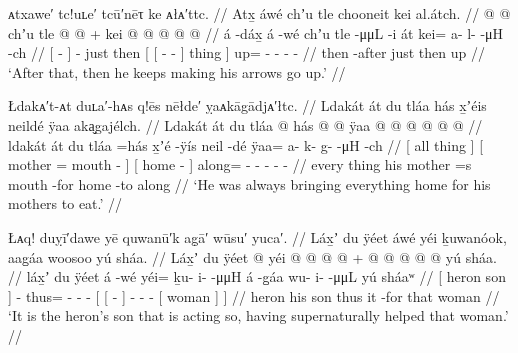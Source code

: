 \ex\label{ex:91-197-after-make-bownarrow-go-up}%
%
\begingl
	\glpreamble	ᴀtxawe′ tc!uʟe′ tcū′nēτ ke ᴀłᴀ′ttc. //
	\glpreamble	Atx̱ áwé chʼu tle chooneit kei al.átch. //
	\gla	{}  @ {} {}  @ {}
		chʼu tle
		{} {}  @ {} @ {} {} {} {} +
		kei @  @ {} @ {} @ {} @ {} //
	\glb	{} á -dáx̱ {} á -wé
		chʼu tle
		{} {}  -μμL -i {} át {}
		kei= a- l-  -μH -ch //
	\glc	{}[  - {}]  -
		just then
		{}[ {}[  - - {}] thing {}]
		up= - -  - - //
	\gld	{} then -after {}  {}
		just then
		{} {}  {} {} {} {} {}
		up  {} {} {} {} //
	\glft	‘After that, then he keeps making his arrows go up.’
		//
\endgl
\xe

\ex\label{ex:91-198-always-bringing-home}%
%
\begingl
	\glpreamble	Łdakᴀ′t-ᴀt duʟa′-hᴀs q!ēs nēłde′ ỵaᴀkāgādjᴀ′łtc. //
	\glpreamble	Ldakát át du tláa hás x̱ʼéis neildé ÿaa aka̬gajélch. //
	\gla	{} Ldakát át {}
		{} du tláa @ \•hás  @ {} {}
		{}  @ {} {}
		ÿaa @  @ {} @ {} @ {} @ {} @ {} //
	\glb	{} ldakát át {}
		{} du tláa =hás x̱ʼé -ÿís {}
		{} neil -dé {}
		ÿaa= a- k- g-  -μH -ch //
	\glc	{}[ all thing {}]
		{}[  mother = mouth - {}]
		{}[ home - {}]
		along= - - -  - - //
	\gld	{} every thing {}
		{} his mother =s mouth -for {}
		{} home -to {}
		along  {} {} {} {} {} //
	\glft	‘He was always bringing everything home for his mothers to eat.’
		//
\endgl
\xe

\ex\label{ex:91-199-heron-son-act-so-super-help}%
%
\begingl
	\glpreamble	Łᴀq! duỵī′dawe yē quwanū′k ag̣ā′ wūsu′ yuca′. //
	\glpreamble	Láx̱ʼ du ÿéet áwé yéi ḵuwanóok, aag̱áa woosoo yú sháa. //
	\gla	{} Láx̱ʼ du ÿéet {}  @ {}
		yéi @  @ {} @ {} @ {} +
		{} {}  @ {} {}
			 @ {} @ {} @ {} @ {}
			{} yú sháa. {} {} //
	\glb	{} láx̱ʼ du ÿéet {} á -wé
		yéi= ḵu- i-  -μμH
		{} {} á -g̱áa {}
			wu- i-  -μμL {}
			{} yú sháaʷ {} {} //
	\glc	{}[ heron  son {}]  -
		thus= - -  -
		{}[ {}[  - {}]
			- -  - \·
			{}[  woman {}] {}] //
	\gld	{} heron his son {}  {}
		thus  {} {} {}
		{} {} it -for {}
			 {} {} {} {}
			{} that woman {} {}  //
	\glft	‘It is the heron’s son that is acting so, having supernaturally helped that woman.’
		//
\endgl
\xe

